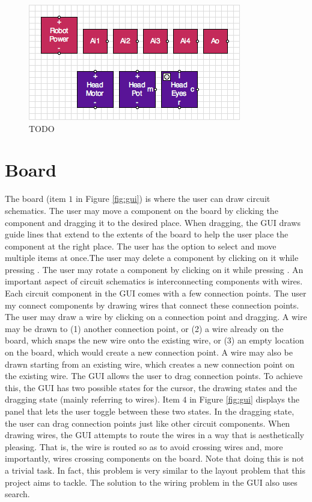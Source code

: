 \begin{figure}
\begin{center}
\includegraphics[scale=0.75]{Images/robot_head_parts.png}
\caption{TODO}
\label{fig:robot_head_parts}
\end{center}
\end{figure}

\section{Board}

The board (item $1$ in Figure \ref{fig:gui}) is where the user can draw circuit
schematics. The user may move a component on the board by clicking the component
and dragging it to the desired place. When dragging, the GUI draws guide lines
that extend to the extents of the board to help the user place the component
at the right place. The user has the option to select and move multiple items at
once.The user may delete a component by clicking on it while
pressing . The user may rotate a component by clicking on it
while pressing . An important aspect of circuit schematics is
interconnecting components with wires. Each circuit component in the GUI comes
with a few connection points. The user my connect components by drawing wires
that connect these connection points. The user may draw a wire by clicking on a
connection point and dragging. A wire may be drawn to (1) another connection
point, or (2) a wire already on the board, which snaps the new wire onto the
existing wire, or (3) an empty location on the board, which would create a new
connection point. A wire may also be drawn starting from an existing wire,
which creates a new connection point on the existing wire. The GUI allows the
user to drag connection points. To achieve this, the GUI has two possible
states for the cursor, the drawing states and the dragging state (mainly
referring to wires). Item $4$ in Figure \ref{fig:gui} displays the panel that
lets the user toggle between these two states. In the dragging state, the user
can drag connection points just like other circuit components.
When drawing wires,
the GUI attempts to route the wires in a way that is aesthetically pleasing.
That is, the wire is routed so as to avoid crossing wires and, more importantly,
wires crossing components on the board. Note that doing this is not a trivial
task. In fact, this problem is very similar to the layout problem that this
project aims to tackle. The solution to the wiring problem in the GUI also uses
search.

